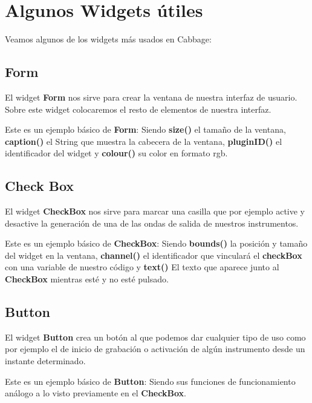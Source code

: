 \section{Algunos Widgets útiles}
Veamos algunos de los widgets más usados en Cabbage:
\subsection{Form}
El widget \textbf{Form} nos sirve para crear la ventana de nuestra interfaz de usuario. Sobre este widget colocaremos el resto de elementos de nuestra interfaz.

Este es un ejemplo básico de \textbf{Form}:
Siendo \textbf{size()} el tamaño de la ventana, \textbf{caption()} el String que muestra la cabecera de la ventana, \textbf{pluginID()} el identificador del widget y \textbf{colour()} su color en formato rgb.

\pagebreak
\subsection{Check Box}
El widget \textbf{CheckBox} nos sirve para marcar una casilla que por ejemplo active y desactive la generación de una de las ondas de salida de nuestros instrumentos.

Este es un ejemplo básico de \textbf{CheckBox}:
Siendo \textbf{bounds()} la posición y tamaño del widget en la ventana, \textbf{channel()} el identificador que vinculará el \textbf{checkBox} con una variable de nuestro código y \textbf{text()} El texto que aparece junto al \textbf{CheckBox} mientras esté y no esté pulsado.

\subsection{Button}
El widget \textbf{Button} crea un botón al que podemos dar cualquier tipo de uso como por ejemplo el de inicio de grabación o activación de algún instrumento desde un instante determinado.

Este es un ejemplo básico de \textbf{Button}:
Siendo sus funciones de funcionamiento análogo a lo visto previamente en el \textbf{CheckBox}.

